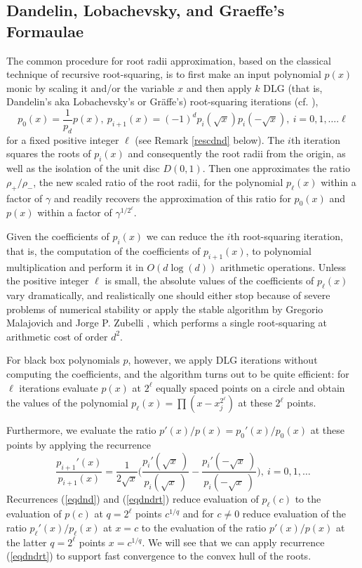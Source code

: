 \documentclass[sigconf]{acmart}
\begin{document}
\subsection{Dandelin, Lobachevsky, and Graeffe's Formaulae}\label{subsec:DLG_form}
 The common procedure for root radii  approximation, based on the classical technique of recursive root-squaring, is to first make an input polynomial $p(x)$ monic by scaling it and/or the variable
  $x$ and then
 apply $k$ DLG (that is, Dandelin's aka
Lobachevsky's or Gr{\"a}ffe's) root-squaring iterations
(cf. \cite{10.2307/2310626}),
\begin{equation}\label{eqdnd}
 p_0(x)=\frac{1}{p_d}p(x),~p_{i+1}(x)=(-1)^ dp_i(\sqrt x)
p_i(-\sqrt x),~i=0,1,\dots.\ell
\end{equation}
for a fixed positive integer $\ell$
(see Remark \ref{rescdnd} below).
The $i$th  iteration squares the roots of $p_i(x)$ and
consequently the root radii from the origin, as well as
the  isolation of the unit disc $D(0,1)$.
Then one approximates
the ratio  $\rho_+/\rho_-$, the new scaled ratio of the root radii, for the polynomial $p_{\ell}(x)$ within a factor of $\gamma$ and readily recovers the approximation of this ratio for $p_0(x)$ and
$p(x)$ within a factor of
$\gamma^{1/2^{\ell}}$.

Given the coefficients of
$p_i(x)$
we can reduce the $i$th root-squaring iteration, that is, the computation of
the coefficients of  $p_{i+1}(x)$, to polynomial multiplication and perform it in $O(d\log(d))$ arithmetic operations.
Unless the positive integer $\ell$ is small, the absolute values of the coefficients
of $p_{\ell}(x)$ vary  dramatically, and realistically one should either stop because of severe problems of numerical stability or apply the stable algorithm by Gregorio Malajovich and Jorge  P. Zubelli \cite{Malajovich2001OnTG}, which performs a single root-squaring at  arithmetic cost of order $d^2$.

For black box polynomials $p$, however, we apply
DLG iterations without computing
the coefficients, and the algorithm turns out to be quite efficient:
 for $\ell$ iterations  evaluate
 $p(x)$ at  $2^{\ell}$ equally spaced points  on a circle and obtain
 the values of the polynomial $p_{\ell}(x)=\prod\left(x-x_j^{2^{\ell}}\right)$
 at these $2^{\ell}$ points.

Furthermore, we evaluate the ratio
$p'(x)/p(x)=p_0'(x)/p_0(x)$
at these points by applying
the recurrence
 \begin{equation}\label{eqdndrt} \frac{p_{i+1}'(x)}{p_{i+1}(x)}=\frac{1}{2\sqrt x}\Big(\frac{p_{i}'(\sqrt x~)}{p_{i}(\sqrt x~)}-\frac{p_{i}'(-\sqrt x~)}{p_{i}(-\sqrt x~)}\Big),~i=0,1,\dots
\end{equation}
Recurrences (\ref{eqdnd}) and (\ref{eqdndrt}) reduce evaluation  of  $p_{\ell}(c)$ to the evaluation of $p(c)$ at  $q=2^{\ell}$  points
$c^{1/q}$ and  for $c\neq 0$ reduce evaluation  of
 the ratio
$p_{\ell}'(x)/p_{\ell}(x)$ at $x=c$ to the evaluation
of the ratio
$p'(x)/p(x)$ at the latter $q=2^{\ell}$ points $x=c^{1/q}$.
We will see that we can apply  recurrence (\ref{eqdndrt})
to support fast convergence to the convex hull of the roots.
\end{document}
